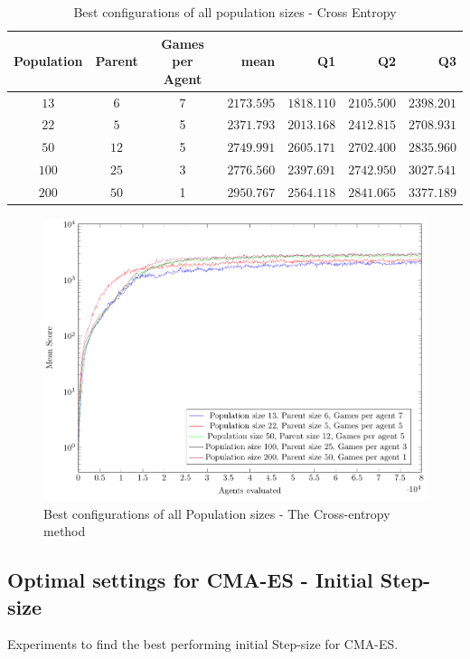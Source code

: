 \clearpage

\begin{table}[H]
\centering
\small
\begin{tabular}{c c c r r r r}
Population & Parent & Games per Agent & mean & Q1 & Q2 & Q3\\
\hline
$13$ & $6$ & 7 & $2173.595$ & $1818.110$ & $2105.500$ & $2398.201$\\
$22$ & $5$ & 5 & $2371.793$ & $2013.168$ & $2412.815$ & $2708.931$\\
$50$ & $12$ & 5 & $2749.991$ & $2605.171$ & $2702.400$ & $2835.960$\\
$100$ & $25$ & 3 & $2776.560$ & $2397.691$ & $2742.950$ & $3027.541$\\
$200$ & $50$ & 1 & $2950.767$ & $2564.118$ & $2841.065$ & $3377.189$\\
\end{tabular}
\caption{Best configurations of all population sizes - Cross Entropy}
\end{table}

\begin{figure}[H]
\centering
\includegraphics[scale=1]{data/ce_population_offspring/bestofall_population/PlotFile.pdf}
\caption{Best configurations of all Population sizes - The Cross-entropy method}
\end{figure}

\clearpage

\subsection{Optimal settings for CMA-ES - Initial Step-size \label{appendixCMAInitialSigma}}
Experiments to find the best performing initial Step-size for CMA-ES.

